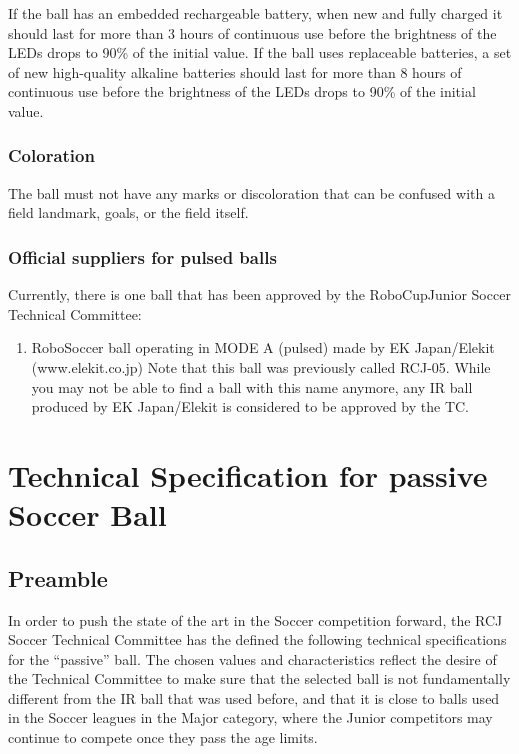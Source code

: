 \documentclass{article}
\begin{document}
If the ball has an embedded rechargeable battery, when new and fully charged it
should last for more than 3 hours of continuous use before the brightness of
the LEDs drops to 90\% of the initial value. If the ball uses replaceable
batteries, a set of new high-quality alkaline batteries should last for more
than 8 hours of continuous use before the brightness of the LEDs drops to 90\%
of the initial value.

\subsubsection{Coloration}

The ball must not have any marks or discoloration that can be confused with a field
landmark, goals, or the field itself.

\subsubsection{Official suppliers for pulsed balls}

Currently, there is one ball that has been approved by the RoboCupJunior Soccer
Technical Committee:

\begin{enumerate}
    \item RoboSoccer ball operating in MODE A (pulsed) made by EK Japan/Elekit (www.elekit.co.jp)
        Note that this ball was previously called RCJ-05. While
            you may not be able to find a ball with this name anymore, any IR
            ball produced by EK Japan/Elekit is considered to be approved by
            the TC.
\end{enumerate}

\section{Technical Specification for passive Soccer Ball\label{ref-passive-spec}}

\subsection{Preamble}

In order to push the state of the art in the Soccer competition forward, the
RCJ Soccer Technical Committee has the defined the following technical
specifications for the ``passive'' ball. The chosen values and characteristics
reflect the desire of the Technical Committee to make sure that the selected
ball is not fundamentally different from the IR ball that was used before, and
that it is close to balls used in the Soccer leagues in the Major category,
where the Junior competitors may continue to compete once they pass the age
limits.
\end{document}
